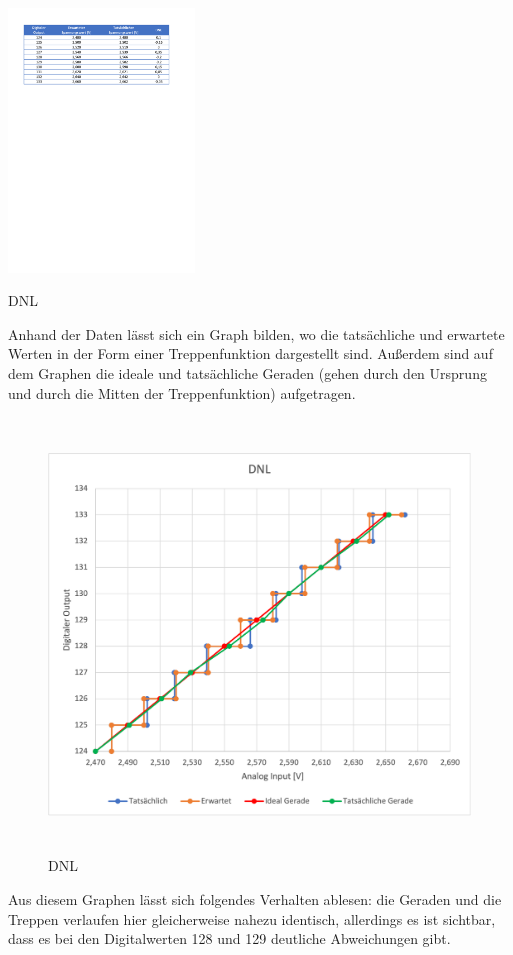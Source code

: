 \begin{table}[H]
	\centering
	\includegraphics[height=7cm]{images/DNL_Tabelle.pdf} 
	\caption[]{DNL}
	\label{table: DNL}
\end{table}

Anhand der Daten lässt sich ein Graph bilden, wo die tatsächliche und erwartete
Werten in der Form einer Treppenfunktion dargestellt sind. Außerdem sind auf dem
Graphen die ideale und tatsächliche Geraden (gehen durch den Ursprung und durch die
Mitten der Treppenfunktion) aufgetragen.

\begin{figure}[H]
	\centering
	\includegraphics[height=11.5cm]{images/DNL.png} 
	\caption[]{DNL}
	\label{fig: DNL}
\end{figure}

Aus diesem Graphen lässt sich folgendes Verhalten ablesen: die Geraden und die
Treppen verlaufen hier gleicherweise nahezu identisch, allerdings es ist sichtbar,
dass es bei den Digitalwerten 128 und 129 deutliche Abweichungen gibt.

